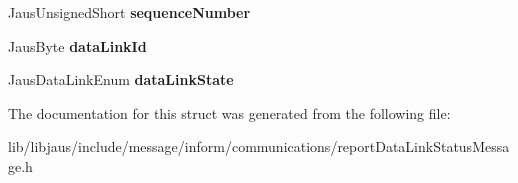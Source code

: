 \begin{DoxyCompactItemize}
\item 
\hypertarget{struct_report_data_link_status_message_struct_a05c9f40ff6d518f5b8262d973eb953d4}{\-Jaus\-Unsigned\-Short {\bfseries sequence\-Number}}\label{struct_report_data_link_status_message_struct_a05c9f40ff6d518f5b8262d973eb953d4}

\item 
\hypertarget{struct_report_data_link_status_message_struct_a4849b7268e542cce63d0fdbbe5ab6eaa}{\-Jaus\-Byte {\bfseries data\-Link\-Id}}\label{struct_report_data_link_status_message_struct_a4849b7268e542cce63d0fdbbe5ab6eaa}

\item 
\hypertarget{struct_report_data_link_status_message_struct_ace933a6fb7a577c065bb7727ef617423}{\-Jaus\-Data\-Link\-Enum {\bfseries data\-Link\-State}}\label{struct_report_data_link_status_message_struct_ace933a6fb7a577c065bb7727ef617423}

\end{DoxyCompactItemize}


\-The documentation for this struct was generated from the following file\-:\begin{DoxyCompactItemize}
\item 
lib/libjaus/include/message/inform/communications/report\-Data\-Link\-Status\-Message.\-h\end{DoxyCompactItemize}
